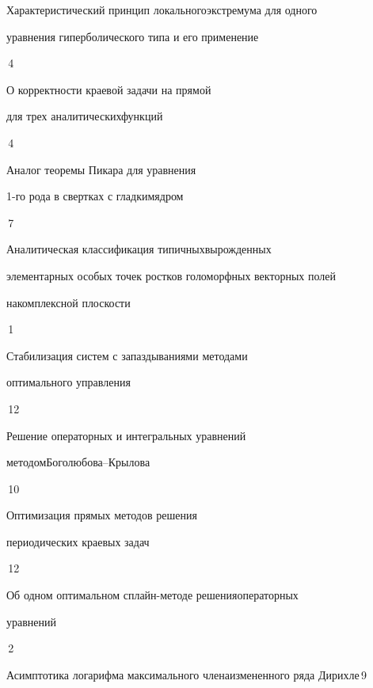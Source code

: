 {Характеристический принцип локального\newline экстремума для одного 


уравнения гиперболического типа и его применение}{\No\,4}




{О корректности краевой задачи на прямой


для трех аналитических\newline функций}{\No\,4}




{Аналог теоремы Пикара для уравнения 


1-го рода в свертках с гладким\newline ядром}{\No\,7}


\pagebreak




{Аналитическая классификация типичных\newline вырожденных


элементарных особых точек ростков голоморфных векторных полей


на\newline комплексной плоскости}{\No\,1}




{Стабилизация систем с запаздываниями методами\newline


оптимального управления}{\No\,12}




{Решение операторных и интегральных уравнений


методом\newline Боголюбова--Крылова}{\No\,10}




{Оптимизация прямых методов решения 


периодических краевых задач}{\No\,12}




{Об одном оптимальном сплайн-методе решения\newline операторных


уравнений}{\No\,2}




{Асимптотика логарифма максимального члена\newline измененного ряда Дирихле}{\No\,9}


